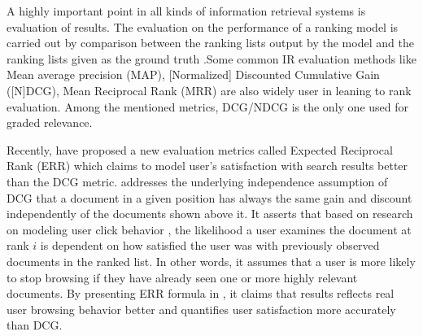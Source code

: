 A highly important point in all kinds of information retrieval systems is evaluation of results. The evaluation on the performance of a ranking model is carried out by comparison between the ranking lists output by the model and the ranking lists given as the ground truth \citep{l2r-intro}.Some common IR evaluation methods like Mean average precision (MAP), [Normalized] Discounted Cumulative Gain ([N]DCG), Mean Reciprocal Rank (MRR) are also widely user in leaning to rank evaluation. Among the mentioned metrics, DCG/NDCG is the only one used for graded relevance.

Recently, \citet{l2r-err} have proposed a new evaluation metrics called Expected Reciprocal Rank (ERR) which claims to model user's satisfaction with search results better than the DCG metric. \citet{l2r-err} addresses the underlying independence assumption of DCG that a document in a given position has always the same gain and discount independently of the documents shown above it. It asserts that based on research on modeling user click behavior \citep{l2r-clickmodel1,l2r-clickmodel2}, the likelihood a user examines the document at rank $i$ is dependent on how satisfied the user was with previously observed documents in the ranked list. In other words, it assumes that a user is more likely to stop browsing if they have already seen one or more highly relevant documents. By presenting ERR formula in \cite{l2r-err}, it claims that results reflects real user browsing behavior better and quantifies user satisfaction more accurately than DCG.
